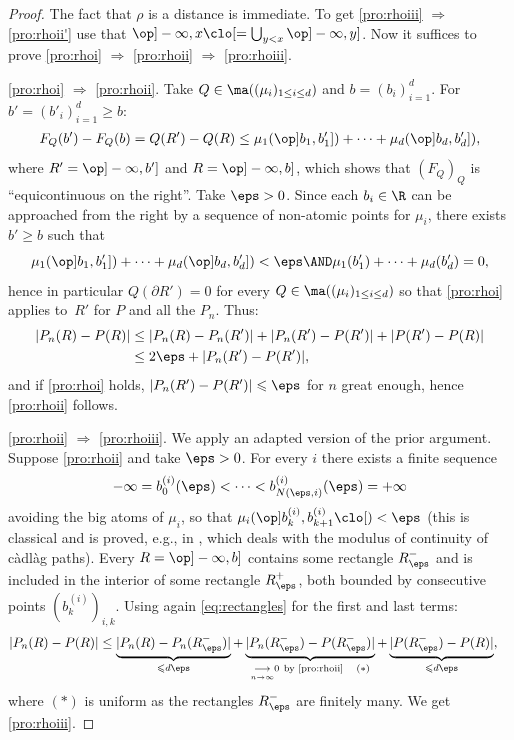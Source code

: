 \begin{proof} The fact that $\rho$ is a distance is immediate. To get \eqref{pro:rhoiii} $\Rightarrow$ \eqref{pro:rhoii'} use that $\op]-\infty,x\clo[=\bigcup_{y<x}\op]-\infty,y]$. Now it suffices to prove \eqref{pro:rhoi} $\Rightarrow$ \eqref{pro:rhoii} $\Rightarrow$ \eqref{pro:rhoiii}.

\eqref{pro:rhoi} $\Rightarrow$ \eqref{pro:rhoii}. Take $Q\in\ma((\mu_i)_{1\leq i\leq d})$ and $b=(b_i)_{i=1}^d$. For $b'=(b'_i)_{i=1}^d\geq b$:
\begin{align}\label{eq:rectangles}
F_Q(b')-F_Q(b)=Q(R')-Q(R)\leq \mu_1(\op]b_1,b'_1])+\cdots+ \mu_d(\op]b_d,b'_d]),
\end{align}
where $R'=\op]-\infty,b']$ and $R=\op]-\infty,b]$, which shows that $(F_Q)_Q$ is ``equicontinuous on the right''. Take $\eps>0$. Since each $b_i\in \R$ can be approached from the right by a sequence of non-atomic points for $\mu_i$, there exists $b'\geqslant b$ such that
\[
\mu_1(\op]b_1,b'_1])+\cdots+ \mu_d(\op]b_d,b'_d])<\eps\AND \mu_1(b'_1)+\cdots+ \mu_d(b'_d)=0,
\]
hence in particular $Q(\partial R')=0$ for every $Q\in \ma((\mu_i)_{1\leq i\leq d})$ so that \eqref{pro:rhoi} applies to~$R'$ for $P$ and all the $P_n$. Thus:\vspace*{-3pt}
\begin{align*}
|P_n(R)- P(R)|&\leq|P_n(R)- P_n(R')|+|P_n(R')-P(R')|+|P(R')- P(R)|\\
&\leq 2\eps+|P_n(R')-P(R')|,
\end{align*}
and if \eqref{pro:rhoi} holds, $|P_n(R')-P(R')|\leqslant\eps$ for $n$ great enough, hence \eqref{pro:rhoii} follows.

\eqref{pro:rhoii} $\Rightarrow$ \eqref{pro:rhoiii}. We apply an adapted version of the prior argument. Suppose \eqref{pro:rhoii} and take $\eps>0$. For every $i$ there exists a finite sequence\vspace*{-3pt}
\[
-\infty=b_0^{(i)}(\eps)<\cdots< b^{(i)}_{N(\eps,i)}(\eps)=+\infty
\]
avoiding the big atoms of $\mu_i$, \ie so that $\mu_i(\op]b_k^{(i)},b_{k+1}^{(i)}\clo[)< \eps$ (this is classical and is proved, e.g., in \cite[\S 12]{Bi}, which deals with the modulus of continuity of càdlàg paths). Every $R=\op]-\infty,b]$ contains some rectangle $R^-_\eps$ and is included in the interior of some rectangle $R^+_\eps$, both bounded by consecutive points $(b^{(i)}_k)_{i,k}$. Using again \eqref{eq:rectangles} for the first and last terms:
\begin{align*}
|P_n(R)- P(R)|&\leq\underbrace{|P_n(R)- P_n(R_\eps^-)|}_{\leqslant d\eps}+\underbrace{|P_n(R_\eps^-)-P(R_\eps^-)|}_{\underset{n\to\infty}\longrightarrow0\ \text{by \eqref{pro:rhoii}}\quad\text{\bf$(\ast)$}}+\underbrace{|P(R_\eps^-)- P(R)|}_{\leqslant d\eps},
\end{align*}
where {\bf$(\ast)$} is uniform as the rectangles $R_\eps^-$ are finitely many. We get \eqref{pro:rhoiii}.
\end{proof}

